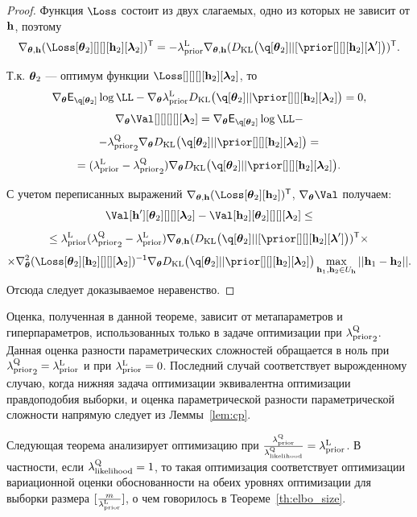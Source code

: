\begin{proof}
Функция $\Loss$ состоит из двух слагаемых, одно из которых не зависит от $\mathbf{h}$, поэтому
\[
    \nabla_{\teta, \h} (\Loss[\teta_2][][][\h_2][\lam_2])^\mathsf{T}  = -\lamCL \nabla_{\teta, \h} (\KL{\q[\teta_2]}{[\prior[][][\h_2][\lam']})^\mathsf{T}.
\]

Т.к. $\boldsymbol{\theta}_2$ --- оптимум функции $\Loss[][][][\h_2][\lam_2]$, то 
$$ 
\nabla_{\teta} \E_{\q[\teta_2]} \log \LL - \nabla_{\teta} \lamCL \KL{\q[\teta_2]}{\prior[][][\h_2][\lam_2]} = 0,
$$
$$ 
\nabla_{\teta} \Val[][][][][\lam_2] =\nabla_{\teta} \E_{\q[\teta_2]} \log \LL -
$$
\[
- {\lamCQ}_2  \nabla_{\teta} \KL{\q[\teta_2]}{\prior[][][\h_2][\lam_2]} = 
\]
$$
   = ({\lamCL} - {\lamCQ}_2)\nabla_{\teta} \KL{\q[\teta_2]}{\prior[][][\h_2][\lam_2]}.
$$

С учетом переписанных выражений $\nabla_{\teta, \h} (\Loss[\teta_2][\h_2])^\mathsf{T}$, $\nabla_{\teta} \Val$ получаем:
\[
     \Val[\h'][\teta_2][][][\lam_2] -  \Val[\h_2][\teta_2][][][\lam_2] \leq 
\]
\[
   \leq \lamCL ({\lamCQ}_2 - {\lamCL}) \nabla_{\teta, \h} (\KL{\q[\teta_2]}{[\prior[][][\h_2][\lam']})^\mathsf{T} \times 
\]
\[
\times  \nabla_{\teta}^2(\Loss[\teta_2][\h_2][][][\lam_2])^\mathsf{-1} \nabla_{\teta} \KL{\q[\teta_2]}{\prior[][][\h_2][\lam_2]} \max_{\h_1, \h_2 \in \Uh} ||\h_1 - \h_2||.
\]
Отсюда следует доказываемое неравенство.
\end{proof}
Оценка, полученная в данной теореме, зависит от метапараметров и гиперпараметров, использованных только в задаче оптимизации при ${\lambda_\text{prior}^\text{Q}}_2$. Данная оценка разности параметрических сложностей обращается в ноль при ${\lambda_\text{prior}^\text{Q}}_2 = \lambda_\text{prior}^\text{L}$ и при $\lambda_\text{prior}^\text{L} = 0$. Последний случай соответствует вырожденному случаю, когда нижняя задача оптимизации эквивалентна оптимизации правдоподобия выборки, и оценка параметрической разности параметрической сложности напрямую следует из Леммы~\ref{lem:cp}.

Следующая теорема анализирует оптимизацию при  $\frac{\lambda_\text{prior}^\text{Q}}{\lambda_\text{likelihood}^\text{Q}} = \lambda_\text{prior}^\text{L}$. В частности, если $\lambda_\text{likelihood}^\text{Q} = 1$, то такая оптимизация соответствует оптимизации вариационной оценки обоснованности на обеих уровнях оптимизации для выборки размера $[\frac{m}{\lambda_\text{prior}^\text{L}}]$, о чем говорилось в Теореме~\ref{th:elbo_size}.

